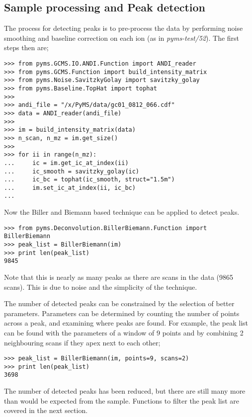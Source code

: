 \subsection{Sample processing and Peak detection}


The process for detecting peaks is to pre-process the data by performing noise
smoothing and baseline correction on each ion (as in {\em pyms-test/52}). The
first steps then are;

\begin{verbatim}
>>> from pyms.GCMS.IO.ANDI.Function import ANDI_reader
>>> from pyms.GCMS.Function import build_intensity_matrix
>>> from pyms.Noise.SavitzkyGolay import savitzky_golay
>>> from pyms.Baseline.TopHat import tophat
>>>
>>> andi_file = "/x/PyMS/data/gc01_0812_066.cdf"
>>> data = ANDI_reader(andi_file)
>>>
>>> im = build_intensity_matrix(data)
>>> n_scan, n_mz = im.get_size()
>>>
>>> for ii in range(n_mz):
...     ic = im.get_ic_at_index(ii)
...     ic_smooth = savitzky_golay(ic)
...     ic_bc = tophat(ic_smooth, struct="1.5m")
...     im.set_ic_at_index(ii, ic_bc)
...
\end{verbatim}

\noindent
Now the Biller and Biemann based technique can be applied to detect peaks.

\begin{verbatim}
>>> from pyms.Deconvolution.BillerBiemann.Function import BillerBiemann
>>> peak_list = BillerBiemann(im)
>>> print len(peak_list)
9845
\end{verbatim}

\noindent
Note that this is nearly as many peaks as there are scans in the data (9865
scans). This is due to noise and the simplicity of the technique.

The number of detected peaks can be constrained by the selection of better
parameters. Parameters can be determined by counting the number of points
across a peak, and examining where peaks are found. For example, the peak list
can be found with the parameters of a window of 9 points and by combining 2
neighbouring scans if they apex next to each other;

\begin{verbatim}
>>> peak_list = BillerBiemann(im, points=9, scans=2)
>>> print len(peak_list)
3698
\end{verbatim}

The number of detected peaks has been reduced, but there are still many more
than would be expected from the sample. Functions to filter the peak list are
covered in the next section.

